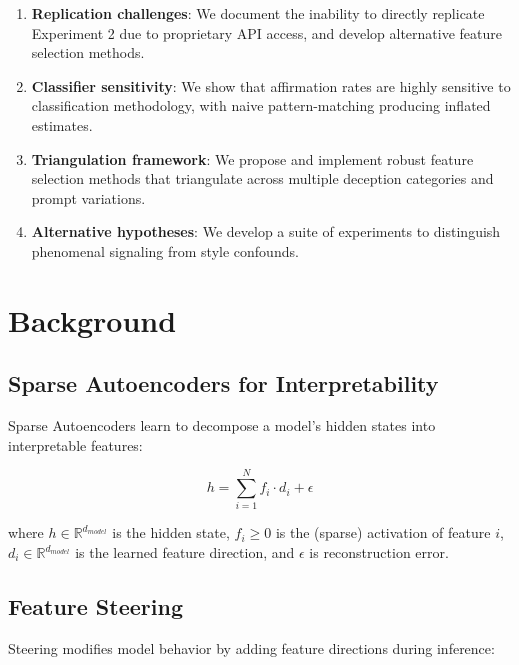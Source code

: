 \documentclass[11pt]{article}
\begin{document}
\begin{enumerate}
    \item \textbf{Replication challenges}: We document the inability to directly replicate Experiment 2 due to proprietary API access, and develop alternative feature selection methods.
    
    \item \textbf{Classifier sensitivity}: We show that affirmation rates are highly sensitive to classification methodology, with naive pattern-matching producing inflated estimates.
    
    \item \textbf{Triangulation framework}: We propose and implement robust feature selection methods that triangulate across multiple deception categories and prompt variations.
    
    \item \textbf{Alternative hypotheses}: We develop a suite of experiments to distinguish phenomenal signaling from style confounds.
\end{enumerate}

\section{Background}

\subsection{Sparse Autoencoders for Interpretability}

Sparse Autoencoders learn to decompose a model's hidden states into interpretable features:

\begin{equation}
h = \sum_{i=1}^{N} f_i \cdot d_i + \epsilon
\end{equation}

where $h \in \mathbb{R}^{d_{model}}$ is the hidden state, $f_i \geq 0$ is the (sparse) activation of feature $i$, $d_i \in \mathbb{R}^{d_{model}}$ is the learned feature direction, and $\epsilon$ is reconstruction error.

\subsection{Feature Steering}

Steering modifies model behavior by adding feature directions during inference:
\end{document}
